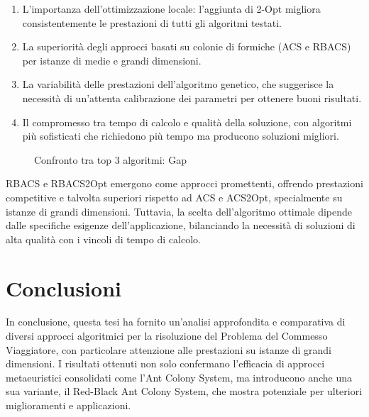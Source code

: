 \begin{enumerate}
	\item L'importanza dell'ottimizzazione locale: l'aggiunta di 2-Opt migliora consistentemente le prestazioni di tutti gli algoritmi testati.
	\item La superiorità degli approcci basati su colonie di formiche (ACS e RBACS) per istanze di medie e grandi dimensioni.
	\item La variabilità delle prestazioni dell'algoritmo genetico, che suggerisce la necessità di un'attenta calibrazione dei parametri per ottenere buoni risultati.
	\item Il compromesso tra tempo di calcolo e qualità della soluzione, con algoritmi più sofisticati che richiedono più tempo ma producono soluzioni migliori.
\end{enumerate}

\begin{figure}[h]
	\caption{Confronto tra top 3 algoritmi: Gap}
	\label{fig:alg_comparison_gap}
\end{figure}

RBACS e RBACS2Opt emergono come approcci promettenti, offrendo prestazioni competitive e talvolta superiori rispetto ad ACS e ACS2Opt, specialmente su istanze di grandi dimensioni. Tuttavia, la scelta dell'algoritmo ottimale dipende dalle specifiche esigenze dell'applicazione, bilanciando la necessità di soluzioni di alta qualità con i vincoli di tempo di calcolo.



\chapter{Conclusioni}
\label{chapt:8}
In conclusione, questa tesi ha fornito un'analisi approfondita e comparativa di diversi approcci algoritmici per la risoluzione del Problema del Commesso Viaggiatore, con particolare attenzione alle prestazioni su istanze di grandi dimensioni. I risultati ottenuti non solo confermano l'efficacia di approcci metaeuristici consolidati come l'Ant Colony System, ma introducono anche una sua variante, il Red-Black Ant Colony System, che mostra potenziale per ulteriori miglioramenti e applicazioni.

